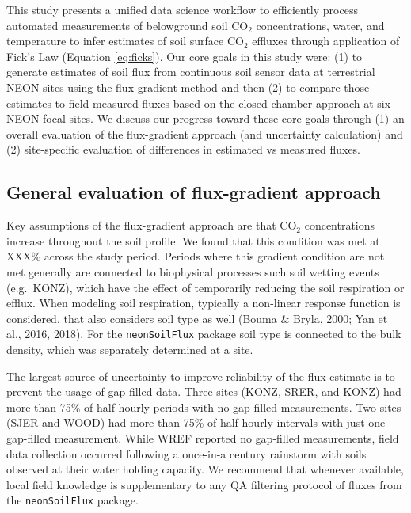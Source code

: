 \documentclass[
  letterpaper,
  DIV=11,
  numbers=noendperiod]{scrartcl}
\begin{document}
This study presents a unified data science workflow to efficiently
process automated measurements of belowground soil CO\(_{2}\)
concentrations, water, and temperature to infer estimates of soil
surface CO\(_{2}\) effluxes through application of Fick's Law (Equation
\ref{eq:ficks}). Our core goals in this study were: (1) to generate
estimates of soil flux from continuous soil sensor data at terrestrial
NEON sites using the flux-gradient method and then (2) to compare those
estimates to field-measured fluxes based on the closed chamber approach
at six NEON focal sites. We discuss our progress toward these core goals
through (1) an overall evaluation of the flux-gradient approach (and
uncertainty calculation) and (2) site-specific evaluation of differences
in estimated vs measured fluxes.

\subsection{General evaluation of flux-gradient
approach}\label{general-evaluation-of-flux-gradient-approach}

Key assumptions of the flux-gradient approach are that CO\(_{2}\)
concentrations increase throughout the soil profile. We found that this
condition was met at XXX\% across the study period. Periods where this
gradient condition are not met generally are connected to biophysical
processes such soil wetting events (e.g.~KONZ), which have the effect of
temporarily reducing the soil respiration or efflux. When modeling soil
respiration, typically a non-linear response function is considered,
that also considers soil type as well (Bouma \& Bryla, 2000; Yan et al.,
2016, 2018). For the \texttt{neonSoilFlux} package soil type is
connected to the bulk density, which was separately determined at a
site.

The largest source of uncertainty to improve reliability of the flux
estimate is to prevent the usage of gap-filled data. Three sites (KONZ,
SRER, and KONZ) had more than 75\% of half-hourly periods with no-gap
filled measurements. Two sites (SJER and WOOD) had more than 75\% of
half-hourly intervals with just one gap-filled measurement. While WREF
reported no gap-filled measurements, field data collection occurred
following a once-in-a century rainstorm with soils observed at their
water holding capacity. We recommend that whenever available, local
field knowledge is supplementary to any QA filtering protocol of fluxes
from the \texttt{neonSoilFlux} package.
\end{document}
